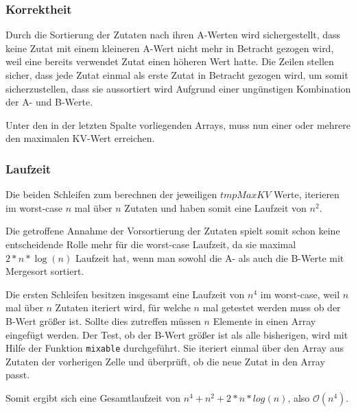 \documentclass[12pt]{scrartcl}%
\theoremstyle{nonumberplain}
\newcommand{\bO}[1]{\mathcal O(#1)}
\newcommand{\code}[1]{\lstinline[basicstyle=\ttfamily\color{black}]{#1}}
\begin{document}
\subsubsection*{Korrektheit}
Durch die Sortierung der Zutaten nach ihren A-Werten wird sichergestellt, dass keine Zutat mit einem kleineren A-Wert nicht mehr in Betracht gezogen wird,
weil eine bereits verwendet Zutat einen höheren Wert hatte. Die Zeilen stellen sicher, dass jede Zutat einmal als erste Zutat in Betracht gezogen wird, um somit sicherzustellen, dass sie aussortiert wird Aufgrund einer ungünstigen Kombination der A- und B-Werte.

Unter den in der letzten Spalte vorliegenden Arrays, muss nun einer oder mehrere den maximalen KV-Wert erreichen.

\newpage

\subsubsection*{Laufzeit}
Die beiden Schleifen zum berechnen der jeweiligen $tmpMaxKV$ Werte, iterieren im worst-case $n$ mal über $n$ Zutaten und haben somit eine Laufzeit von $n^2$.

Die getroffene Annahme der Vorsortierung der Zutaten spielt somit schon keine entscheidende Rolle mehr für die worst-case Laufzeit, da sie maximal $2 * n * \log(n)$ Laufzeit hat, wenn man sowohl die A- als auch die B-Werte mit Mergesort sortiert.

Die ersten Schleifen besitzen insgesamt eine Laufzeit von $n^4$ im worst-case, weil $n$ mal über $n$ Zutaten iteriert wird, für welche $n$ mal getestet werden muss ob der B-Wert größer ist. Sollte dies zutreffen müssen $n$ Elemente in einen Array eingefügt werden.
Der Test, ob der B-Wert größer ist als alle bisherigen, wird mit Hilfe der Funktion \code{mixable} durchgeführt. Sie iteriert einmal über den Array aus Zutaten der vorherigen Zelle und überprüft, ob die neue Zutat in den Array passt. 

Somit ergibt sich eine Gesamtlaufzeit von $n^4 + n^2 + 2 * n * log(n)$, also $\bO{n^4}$.
\end{document}
